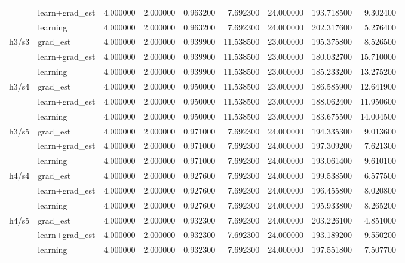 \begin{tabular}{llllrrrrr}
\cline{2-9} \cline{3-9}
 & learn+grad_est & 4.000000 & 2.000000 & 0.963200 & 7.692300 & 24.000000 & 193.718500 & 9.302400 \\
\cline{2-9} \cline{3-9}
 & learning & 4.000000 & 2.000000 & 0.963200 & 7.692300 & 24.000000 & 202.317600 & 5.276400 \\
\cline{1-9} \cline{2-9} \cline{3-9}
\multirow[t]{3}{*}{h3/s3} & grad_est & 4.000000 & 2.000000 & 0.939900 & 11.538500 & 23.000000 & 195.375800 & 8.526500 \\
\cline{2-9} \cline{3-9}
 & learn+grad_est & 4.000000 & 2.000000 & 0.939900 & 11.538500 & 23.000000 & 180.032700 & 15.710000 \\
\cline{2-9} \cline{3-9}
 & learning & 4.000000 & 2.000000 & 0.939900 & 11.538500 & 23.000000 & 185.233200 & 13.275200 \\
\cline{1-9} \cline{2-9} \cline{3-9}
\multirow[t]{3}{*}{h3/s4} & grad_est & 4.000000 & 2.000000 & 0.950000 & 11.538500 & 23.000000 & 186.585900 & 12.641900 \\
\cline{2-9} \cline{3-9}
 & learn+grad_est & 4.000000 & 2.000000 & 0.950000 & 11.538500 & 23.000000 & 188.062400 & 11.950600 \\
\cline{2-9} \cline{3-9}
 & learning & 4.000000 & 2.000000 & 0.950000 & 11.538500 & 23.000000 & 183.675500 & 14.004500 \\
\cline{1-9} \cline{2-9} \cline{3-9}
\multirow[t]{3}{*}{h3/s5} & grad_est & 4.000000 & 2.000000 & 0.971000 & 7.692300 & 24.000000 & 194.335300 & 9.013600 \\
\cline{2-9} \cline{3-9}
 & learn+grad_est & 4.000000 & 2.000000 & 0.971000 & 7.692300 & 24.000000 & 197.309200 & 7.621300 \\
\cline{2-9} \cline{3-9}
 & learning & 4.000000 & 2.000000 & 0.971000 & 7.692300 & 24.000000 & 193.061400 & 9.610100 \\
\cline{1-9} \cline{2-9} \cline{3-9}
\multirow[t]{3}{*}{h4/s4} & grad_est & 4.000000 & 2.000000 & 0.927600 & 7.692300 & 24.000000 & 199.538500 & 6.577500 \\
\cline{2-9} \cline{3-9}
 & learn+grad_est & 4.000000 & 2.000000 & 0.927600 & 7.692300 & 24.000000 & 196.455800 & 8.020800 \\
\cline{2-9} \cline{3-9}
 & learning & 4.000000 & 2.000000 & 0.927600 & 7.692300 & 24.000000 & 195.933800 & 8.265200 \\
\cline{1-9} \cline{2-9} \cline{3-9}
\multirow[t]{3}{*}{h4/s5} & grad_est & 4.000000 & 2.000000 & 0.932300 & 7.692300 & 24.000000 & 203.226100 & 4.851000 \\
\cline{2-9} \cline{3-9}
 & learn+grad_est & 4.000000 & 2.000000 & 0.932300 & 7.692300 & 24.000000 & 193.189200 & 9.550200 \\
\cline{2-9} \cline{3-9}
 & learning & 4.000000 & 2.000000 & 0.932300 & 7.692300 & 24.000000 & 197.551800 & 7.507700 \\
\cline{1-9} \cline{2-9} \cline{3-9}
\bottomrule
\end{tabular}
